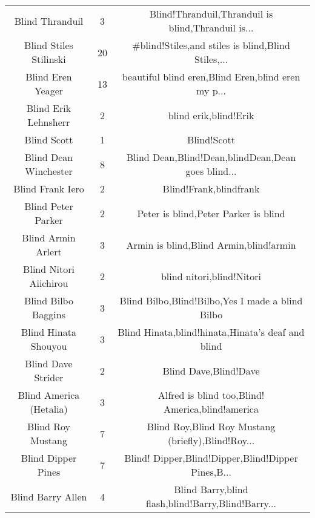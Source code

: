 \begin{table}[h!]
{\begin{tabular}{|c|c|c|}
                                   Blind Thranduil &      3 & Blind!Thranduil,Thranduil is blind,Thranduil is... \\
                            Blind Stiles Stilinski &     20 & \#blind!Stiles,and stiles is blind,Blind Stiles,... \\
                                 Blind Eren Yeager &     13 & beautiful blind eren,Blind Eren,blind eren my p... \\
                              Blind Erik Lehnsherr &      2 &                              blind erik,blind!Erik \\
                                       Blind Scott &      1 &                                        Blind!Scott \\
                             Blind Dean Winchester &      8 & Blind Dean,Blind!Dean,blindDean,Dean goes blind... \\
                                  Blind Frank Iero &      2 &                             Blind!Frank,blindfrank \\
                                Blind Peter Parker &      2 &               Peter is blind,Peter Parker is blind \\
                                Blind Armin Arlert &      3 &             Armin is blind,Blind Armin,blind!armin \\
                            Blind Nitori Aiichirou &      2 &                          blind nitori,blind!Nitori \\
                               Blind Bilbo Baggins &      3 &   Blind Bilbo,Blind!Bilbo,Yes I made a blind Bilbo \\
                              Blind Hinata Shouyou &      3 &  Blind Hinata,blind!hinata,Hinata’s deaf and blind \\
                                Blind Dave Strider &      2 &                              Blind Dave,Blind!Dave \\
                           Blind America (Hetalia) &      3 &   Alfred is blind too,Blind! America,blind!america \\
                                 Blind Roy Mustang &      7 & Blind Roy,Blind Roy Mustang (briefly),Blind!Roy... \\
                                Blind Dipper Pines &      7 & Blind! Dipper,Blind!Dipper,Blind!Dipper Pines,B... \\
                                 Blind Barry Allen &      4 & Blind Barry,blind flash,blind!Barry,Blind!Barry... \\

\end{tabular}}
\end{table}

